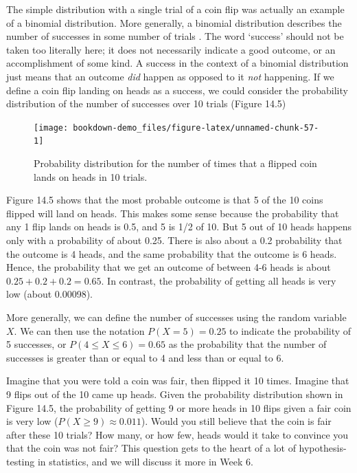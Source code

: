 \documentclass[
]{scrbook}
\begin{document}
The simple distribution with a single trial of a coin flip was actually an example of a binomial distribution.
More generally, a binomial distribution describes the number of successes in some number of trials \citep{Miller2004}.
The word `success' should not be taken too literally here; it does not necessarily indicate a good outcome, or an accomplishment of some kind.
A success in the context of a binomial distribution just means that an outcome \emph{did} happen as opposed to it \emph{not} happening.
If we define a coin flip landing on heads as a success, we could consider the probability distribution of the number of successes over 10 trials (Figure 14.5)

\begin{figure}
\texttt{[image: bookdown-demo\_files/figure-latex/unnamed-chunk-57-1]} \caption{Probability distribution for the number of times that a flipped coin lands on heads in 10 trials.}\label{fig:unnamed-chunk-57}
\end{figure}

Figure 14.5 shows that the most probable outcome is that 5 of the 10 coins flipped will land on heads.
This makes some sense because the probability that any 1 flip lands on heads is 0.5, and 5 is 1/2 of 10.
But 5 out of 10 heads happens only with a probability of about 0.25.
There is also about a 0.2 probability that the outcome is 4 heads, and the same probability that the outcome is 6 heads.
Hence, the probability that we get an outcome of between 4-6 heads is about \(0.25 + 0.2 + 0.2 = 0.65\).
In contrast, the probability of getting all heads is very low (about 0.00098).

More generally, we can define the number of successes using the random variable \(X\).
We can then use the notation \(P(X = 5) = 0.25\) to indicate the probability of 5 successes, or \(P(4 \leq X \leq 6) = 0.65\) as the probability that the number of successes is greater than or equal to 4 and less than or equal to 6.

Imagine that you were told a coin was fair, then flipped it 10 times.
Imagine that 9 flips out of the 10 came up heads.
Given the probability distribution shown in Figure 14.5, the probability of getting 9 or more heads in 10 flips given a fair coin is very low (\(P(X \geq 9) \approx 0.011\)).
Would you still believe that the coin is fair after these 10 trials?
How many, or how few, heads would it take to convince you that the coin was not fair?
This question gets to the heart of a lot of hypothesis-testing in statistics, and we will discuss it more in Week 6.
\end{document}
